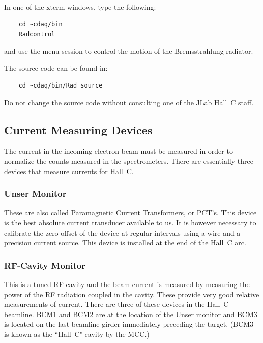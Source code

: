 In one of the xterm windows, type the following:

\begin{verbatim}
	cd ~cdaq/bin
	Radcontrol
\end{verbatim}

and use the menu session to control the motion of the
Bremsstrahlung radiator.

The source code can be found in:

\begin{verbatim}
	cd ~cdaq/bin/Rad_source
\end{verbatim}

Do not change the source code without consulting
one of the JLab Hall~C staff.

\subsection{Current Measuring Devices}

The current in the incoming electron beam must be measured in order to
normalize the counts measured in the spectrometers. There are essentially
three devices that measure currents for Hall~C.

\subsubsection{Unser Monitor}  These are also called Paramagnetic Current Transformers,
or PCT's. This device is the best absolute current transducer available to us.
It is however necessary to calibrate the zero offset of the device at
regular intervals using a wire and a precision current source. This device
is installed at the end of the Hall~C arc.
\subsubsection{RF-Cavity Monitor} This is a tuned RF cavity and the beam current
is measured by measuring the power of the RF radiation coupled in the cavity.
These provide very good relative measurements of current. There are three
of these
devices in the Hall~C beamline. BCM1 and BCM2 are at the location of the Unser
monitor and BCM3 is located on the last beamline girder
immediately preceding the target.  (BCM3 is known as the ``Hall~C" cavity 
by the MCC.)


